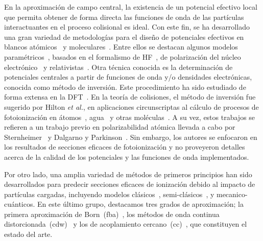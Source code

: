 En la aproximación de campo central, la existencia de un potencial 
efectivo local que permita obtener de forma directa las funciones de 
onda de las partículas interactuantes en el proceso colisional es ideal.
Con este fin, se ha desarrollado una gran variedad de metodologías para 
el diseño de potenciales efectivos en blancos atómicos~\cite{Hibbert:82} 
y moleculares~\cite{Menchero:10,Granados:16}. Entre ellos se destacan 
algunos modelos paramétricos~\cite{Gombas:56,Green:69,Klapisch:71}, 
basados en el formalismo de HF~\cite{Phillips:59,Herman:63}, de 
polarización del núcleo electrónico~\cite{Dalgarno:70,Bayliss:77} y 
relativistas~\cite{Cowan:76,Lee:77}. Otra técnica conocida es la 
determinación de potenciales centrales a partir de funciones de onda y/o 
densidades electrónicas, conocida como método de inversión. Este 
procedimiento ha sido estudiado de forma extensa en la 
DFT~\cite{Wu:03,Gaiduk:13,Ryabinkin:15,Schipper:97,deSilva:12,
Kananenka:13,Mura:97,Jacob:11}. 
En la teoría de colisiones, el método de inversión fue sugerido por 
Hilton \textit{et al.}, en aplicaciones circunscriptas al cálculo de 
procesos de fotoionización en átomos~\cite{Hilton:77,Suzer:77}, 
agua~\cite{Hilton:79} y otras moléculas~\cite{Hilton:80,Crljen:87}. A su 
vez, estos trabajos se refieren a un trabajo previo en polarizabilidad 
atómica llevada a cabo por Sternheimer~\cite{Sternheimer:54} y Dalgarno 
y Parkinson~\cite{Dalgarno:59}. Sin embargo, los autores se enfocaron en 
los resultados de secciones eficaces de fotoionización y no proveyeron 
detalles acerca de la calidad de los potenciales y las funciones de 
onda implementados.

Por otro lado, una amplia variedad de métodos de primeros principios han 
sido desarrollados para predecir secciones eficaces de ionización debido 
al impacto de partículas cargadas, incluyendo modelos 
clásicos~\cite{Catlow:67}, semi-clásicos~\cite{falta}, y mecanico-cuánticos. 
En este último grupo, destacamos tres grados de aproximación; la primera 
aproximación de Born~(\acs{fba})~\cite{Bates:62,McDowell:61}, los 
métodos de onda continua distorcionada~(\acs{cdw})~\cite{Crothers:10,
Rivarola:87} y los de acoplamiento cercano~(\acs{cc})~\cite{Pindzola:07,
Burke:11,Pindzola:16,Bray:17}, que constituyen el estado del arte.

